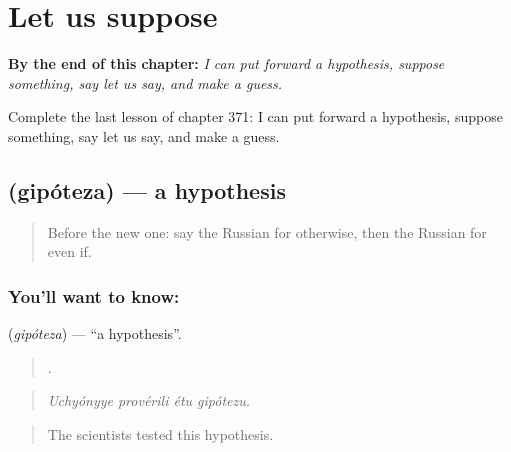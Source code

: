 
\chapter{Let us suppose}
\label{ch:ru-let-us-suppose}

\begin{chapteropening}
\textbf{By the end of this chapter:} \emph{I can put forward a hypothesis, suppose something, say let us say, and make a guess.}

Complete the last lesson of chapter 371: I can put forward a hypothesis, suppose something, say let us say, and make a guess.
\end{chapteropening}

\section[\texorpdfstring{\ru{гипотеза} (gipóteza)}{гипотеза (gipóteza)}]{ (gipóteza) — a hypothesis}

\label{lesson:RU-C371-gipoteza}



\begin{quote}
Before the new one: say the Russian for otherwise, then the Russian for even if.
\end{quote}

\subsection*{You'll want to know: }
\textbf{} (\emph{gipóteza}) — \textquotedblleft{}a hypothesis\textquotedblright{}.

\begin{quote}
   .
\end{quote}

\begin{quote}
\emph{Uchyónyye provérili étu gipótezu.}
\end{quote}

\begin{quote}
The scientists tested this hypothesis.
\end{quote}

